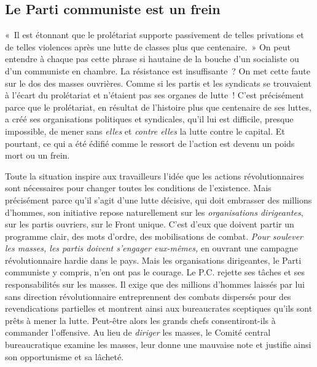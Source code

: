 \documentclass[french,twoside]{book} %
\begin{document}
 \subsection[{Le Parti communiste est un frein}]{Le Parti communiste est un frein}
\noindent « Il est étonnant que le prolétariat supporte passivement de telles privations et de telles violences après une lutte de classes plus que centenaire. » On peut entendre à chaque pas cette phrase si hautaine de la bouche d’un socialiste ou d’un communiste en chambre. La résistance est insuffisante ? On met cette faute sur le dos des masses ouvrières. Comme si les partis et les syndicats se trouvaient à l’écart du prolétariat et n’étaient pas ses organes de lutte ! C’est précisément parce que le prolétariat, en résultat de l’histoire plus que centenaire de ses luttes, a créé ses organisations politiques et syndicales, qu’il lui est difficile, presque impossible, de mener sans \emph{elles} et \emph{contre elles} la lutte contre le capital. Et pourtant, ce qui a été édifié comme le ressort de l’action est devenu un poids mort ou un frein.\par
Toute la situation inspire aux travailleurs l’idée que les actions révolutionnaires sont nécessaires pour changer toutes les conditions de l’existence. Mais précisément parce qu’il s’agit d’une lutte décisive, qui doit embrasser des millions d’hommes, son initiative repose naturellement sur les \emph{organisations dirigeantes}, sur les partis ouvriers, sur le Front unique. C’est d’eux que doivent partir un programme clair, des mots d’ordre, des mobilisations de combat. \emph{Pour soulever les masses, les partis doivent s’engager eux-mêmes,} en ouvrant une campagne révolutionnaire hardie dans le pays. Mais les organisations dirigeantes, le Parti communiste y compris, n’en ont pas le courage. Le P.C. rejette ses tâches et ses responsabilités sur les masses. Il exige que des millions d’hommes laissés par lui sans direction révolutionnaire entreprennent des combats dispersés pour des revendications partielles et montrent ainsi aux bureaucrates sceptiques qu’ils sont prêts à mener la lutte. Peut-être alors les grands chefs  consentiront-ils à commander l’offensive. Au lieu de \emph{diriger} les masses, le Comité central bureaucratique examine les masses, leur donne une mauvaise note et justifie ainsi son opportunisme et sa lâcheté.
\end{document}
